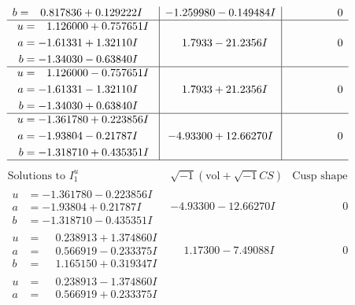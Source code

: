 \documentclass[1p]{elsarticle_modified}
\theoremstyle{definition}
\newcommand{\I}{\sqrt{-1}}
\begin{document}
$$\begin{array}{c|c|c}
\begin{aligned}
b &= \phantom{-}0.817836 + 0.129222 I\end{aligned}
 & -1.259980 - 0.149484 I & \phantom{-0.000000 } 0 \\ \hline\begin{aligned}
u &= \phantom{-}1.126000 + 0.757651 I \\
a &= -1.61331 + 1.32110 I \\
b &= -1.34030 - 0.63840 I\end{aligned}
 & \phantom{-}1.7933 - 21.2356 I & \phantom{-0.000000 } 0 \\ \hline\begin{aligned}
u &= \phantom{-}1.126000 - 0.757651 I \\
a &= -1.61331 - 1.32110 I \\
b &= -1.34030 + 0.63840 I\end{aligned}
 & \phantom{-}1.7933 + 21.2356 I & \phantom{-0.000000 } 0 \\ \hline\begin{aligned}
u &= -1.361780 + 0.223856 I \\
a &= -1.93804 - 0.21787 I \\
b &= -1.318710 + 0.435351 I\end{aligned}
 & -4.93300 + 12.66270 I & \phantom{-0.000000 } 0\\
 \hline 
 \end{array}$$\newpage$$\begin{array}{c|c|c}  
\text{Solutions to }I^u_{1}& \I (\text{vol} + \sqrt{-1}CS) & \text{Cusp shape}\\
 \hline 
\begin{aligned}
u &= -1.361780 - 0.223856 I \\
a &= -1.93804 + 0.21787 I \\
b &= -1.318710 - 0.435351 I\end{aligned}
 & -4.93300 - 12.66270 I & \phantom{-0.000000 } 0 \\ \hline\begin{aligned}
u &= \phantom{-}0.238913 + 1.374860 I \\
a &= \phantom{-}0.566919 - 0.233375 I \\
b &= \phantom{-}1.165150 + 0.319347 I\end{aligned}
 & \phantom{-}1.17300 - 7.49088 I & \phantom{-0.000000 } 0 \\ \hline\begin{aligned}
u &= \phantom{-}0.238913 - 1.374860 I \\
a &= \phantom{-}0.566919 + 0.233375 I \\

\end{aligned}
\end{array}$$
\end{document}
